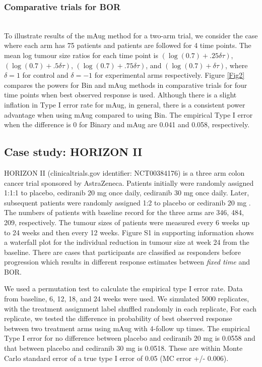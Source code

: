 \documentclass[10pt,A4]{article}
\begin{document}
\subsubsection{Comparative trials for BOR} ~\\
To illustrate results of the mAug method for a two-arm trial, we consider the case where each arm has 75 patients and patients are followed for 4 time points. The mean log tumour size ratios for each time point is $( \log(0.7) + .25\delta \tau)$, $( \log(0.7) + .5\delta \tau)$, $( \log(0.7) + .75\delta \tau)$, and $( \log(0.7) +\delta \tau)$, where $\delta=1$ for control and $\delta=-1$ for experimental arms respectively. Figure \ref{Fig2} compares the powers for Bin and mAug methods in comparative trials for four time points when best observed response is used. Although there is a slight inflation in Type I error rate for mAug, in general, there is a consistent power advantage when using mAug compared to using Bin. The empirical Type I error when the difference is 0 for Binary and mAug are 0.041 and 0.058, respectively.

\subsection{Case study: HORIZON II}\label{Horizon}

HORIZON II (clinicaltrials.gov identifier: NCT00384176) is a three arm colon cancer trial sponsored by AstraZeneca. Patients initially were randomly assigned 1:1:1 to placebo, cediranib 20 mg once daily, cediranib 30 mg once daily. Later, subsequent patients were randomly assigned 1:2 to placebo or cediranib 20 mg \cite{Hoff2012}. The numbers of patients with baseline record for the three arms are 346, 484, 209, respectively. The tumour sizes of patients were measured every 6 weeks up to 24 weeks and then every 12 weeks. Figure S1 in supporting information shows a waterfall plot for the individual reduction in tumour size at week 24 from the baseline. There are cases that participants are classified as responders before progression which results in different response estimates between \textit{fixed time} and BOR.

We used a permutation test to calculate the empirical type I error rate. Data from baseline, 6, 12, 18, and 24 weeks were used. We simulated 5000 replicates, with the treatment assignment label shuffled randomly in each replicate, For each replicate, we tested the difference in probability of best observed response between two treatment arms using mAug with 4-follow up times. The empirical Type I error for no difference between placebo and cediranib 20 mg is 0.0558 and that between placebo and cediranib 30 mg is 0.0518. These are within Monte Carlo standard error of a true type I error of 0.05 (MC error +/- 0.006).
\end{document}
